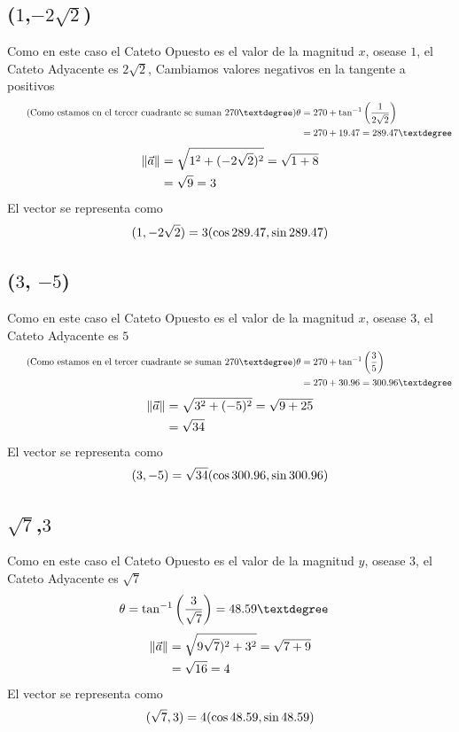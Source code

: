 \documentclass[14pt]{extarticle}
\DeclarePairedDelimiter\norm{\lVert}{\rVert}%
\newcommand{\taninv}{\tan^{-1}}
\begin{document}
    \subsection{($1$,$-2\sqrt{2}$)}
         Como en este caso el Cateto Opuesto es el valor de la magnitud $x$, osease $1$, el Cateto Adyacente es $2\sqrt{2}$, Cambiamos valores negativos en la tangente a positivos
        \begin{align}
            \tag{Como estamos en el tercer cuadrante se suman $270°$} \theta &= 270 + \taninv{\left(\frac{1}{2\sqrt{2}}\right)} \\
            \notag &= 270 + 19.47 = 289.47°
        \end{align}
        \begin{align}
            \notag \norm{\vec{a}} &= \sqrt{1^2+(-2\sqrt{2})^2} = \sqrt{1+8} \\
            \notag &= \sqrt{9} = 3
        \end{align}
        El vector se representa como
        \begin{align}
           \notag (1,-2\sqrt{2}) = 3(\cos289.47,\sin289.47)
        \end{align}
    \subsection{($3$, $-5$)}
        Como en este caso el Cateto Opuesto es el valor de la magnitud $x$, osease $3$, el Cateto Adyacente es $5$
        \begin{align}
            \tag{Como estamos en el tercer cuadrante se suman $270°$} \theta &= 270 + \taninv{\left(\frac{3}{5}\right)} \\
            \notag &= 270 + 30.96 = 300.96°
            \end{align}
        \begin{align}
            \notag \norm{\vec{a}} &= \sqrt{3^2+(-5)^2} = \sqrt{9+25} \\
            \notag &= \sqrt{34}
        \end{align}
        El vector se representa como
        \begin{align}
           \notag (3,-5) = \sqrt{34}(\cos300.96,\sin300.96)
        \end{align}
    \subsection{$\sqrt{7}$,$3$}
    Como en este caso el Cateto Opuesto es el valor de la magnitud $y$, osease $3$, el Cateto Adyacente es $\sqrt{7}$
        \begin{align}
            \notag \theta &= \taninv{\left(\frac{3}{\sqrt{7}}\right)} = 48.59°
        \end{align}
        \begin{align}
            \notag \norm{\vec{a}} &= \sqrt{9\sqrt{7})^2+3^2} = \sqrt{7+9} \\
            \notag &= \sqrt{16} = 4
        \end{align}
        El vector se representa como
        \begin{align}
           \notag (\sqrt{7},3) = 4(\cos48.59,\sin48.59)
        \end{align}
\end{document}
